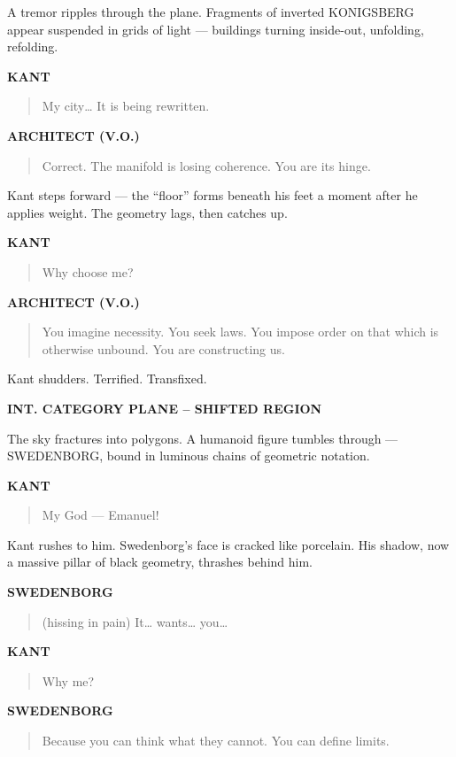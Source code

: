 \documentclass[12pt]{article}
\newcommand{\Scene}[1]{\vspace{1.2em}\textbf{#1}\vspace{0.8em}}
\newcommand{\Character}[1]{\vspace{0.8em}\textbf{#1}\vspace{0.4em}}
\newenvironment{Dialogue}{\begin{quote}\begin{RaggedRight}}{\end{RaggedRight}\end{quote}}
\newcommand{\Action}[1]{\vspace{0.4em}#1\vspace{0.4em}}
\begin{document}
\Action{A tremor ripples through the plane.  
Fragments of inverted KONIGSBERG appear suspended in grids of light —  
buildings turning inside-out, unfolding, refolding.}

\Character{KANT}
\begin{Dialogue}
My city…  
It is being rewritten.
\end{Dialogue}

\Character{ARCHITECT (V.O.)}
\begin{Dialogue}
Correct.  
The manifold is losing coherence.  
You are its hinge.
\end{Dialogue}

\Action{Kant steps forward —  
the “floor” forms beneath his feet a moment after he applies weight.  
The geometry lags, then catches up.}

\Character{KANT}
\begin{Dialogue}
Why choose me?
\end{Dialogue}

\Character{ARCHITECT (V.O.)}
\begin{Dialogue}
You imagine necessity.  
You seek laws.  
You impose order on that which is otherwise unbound.  
You are constructing us.
\end{Dialogue}

\Action{Kant shudders.  
Terrified.  
Transfixed.}

\Scene{INT. CATEGORY PLANE – SHIFTED REGION}

\Action{The sky fractures into polygons.  
A humanoid figure tumbles through —  
SWEDENBORG, bound in luminous chains of geometric notation.}

\Character{KANT}
\begin{Dialogue}
My God — Emanuel!
\end{Dialogue}

\Action{Kant rushes to him.  
Swedenborg’s face is cracked like porcelain.  
His shadow, now a massive pillar of black geometry, thrashes behind him.}

\Character{SWEDENBORG}
\begin{Dialogue}
(hissing in pain)  
It… wants… you…
\end{Dialogue}

\Character{KANT}
\begin{Dialogue}
Why me?
\end{Dialogue}

\Character{SWEDENBORG}
\begin{Dialogue}
Because you can think what they cannot.  
You can define limits.
\end{Dialogue}
\end{document}
